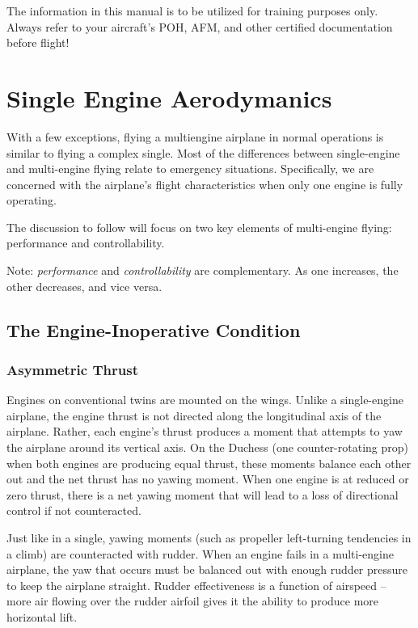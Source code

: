 The information in this manual is to be utilized for training purposes only. Always
refer to your aircraft's POH, AFM, and other certified documentation before flight!

\chapter{Single Engine Aerodymanics}


With a few exceptions, flying a multiengine airplane in normal operations is similar to flying a
complex single. Most of the differences between single-engine and multi-engine flying relate to
emergency situations. Specifically, we are concerned with the airplane’s flight characteristics
when only one engine is fully operating.

The discussion to follow will focus on two key elements of multi-engine flying: performance and controllability.

Note: \emph{performance} and \emph{controllability} are complementary. As one increases, the other decreases, and vice versa.

\section{The Engine-Inoperative Condition}

\subsection{Asymmetric Thrust}

Engines on conventional twins are mounted on the wings. Unlike a single-engine airplane, the engine thrust is not
directed along the longitudinal axis of the airplane. Rather, each engine’s thrust produces a moment that attempts to
yaw the airplane around its vertical axis. On the Duchess (one counter-rotating prop) when both engines are
producing equal thrust, these moments balance each other out and the net thrust has no yawing moment. When one
engine is at reduced or zero thrust, there is a net yawing moment that will lead to a loss of directional control if not
counteracted.

Just like in a single, yawing moments (such as propeller left-turning tendencies in a climb) are counteracted with
rudder. When an engine fails in a multi-engine airplane, the yaw that occurs must be balanced out with enough
rudder pressure to keep the airplane straight. Rudder effectiveness is a function of airspeed – more air flowing over
the rudder airfoil gives it the ability to produce more horizontal lift.

